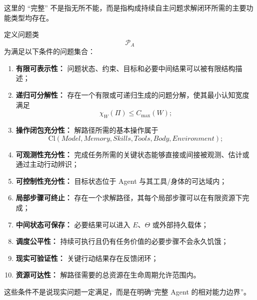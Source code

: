 这里的 ``完整'' 不是指无所不能，而是指构成持续自主问题求解闭环所需的主要功能类型均存在。

定义问题类
\begin{equation}
\mathscr P_A
\end{equation}
为满足以下条件的问题集合：

\begin{enumerate}
    \item \textbf{有限可表示性：}
    问题状态、约束、目标和必要中间结果可以被有限结构描述；
    
    \item \textbf{递归可分解性：}
    存在一个有限或可递归生成的问题分解，使其最小认知宽度满足
    \begin{equation}
    \chi_W(\Pi)
    \leq
    C_{\max}(W);
    \end{equation}
    
    \item \textbf{操作闭包充分性：}
    解路径所需的基本操作属于
    \begin{equation}
    \mathrm{Cl}
    (
    Model,
    Memory,
    Skills,
    Tools,
    Body,
    Environment
    );
    \end{equation}
    
    \item \textbf{可观测性充分性：}
    完成任务所需的关键状态能够直接或间接被观测、估计或通过主动行动辨识；
    
    \item \textbf{可控制性充分性：}
    目标状态位于 Agent 与其工具/身体的可达域内；
    
    \item \textbf{局部步骤可终止：}
    存在一个求解路径，其每个局部步骤可以在有限资源下完成；
    
    \item \textbf{中间状态可保存：}
    必要结果可以进入 $E$、$\Theta$ 或外部持久载体；
    
    \item \textbf{调度公平性：}
    持续可执行且仍有任务价值的必要步骤不会永久饥饿；
    
    \item \textbf{现实可验证性：}
    关键行动结果存在反馈闭环；
    
    \item \textbf{资源可达性：}
    解路径需要的总资源在生命周期允许范围内。
\end{enumerate}

这些条件不是说现实问题一定满足，而是在明确“完整 Agent 的相对能力边界”。

